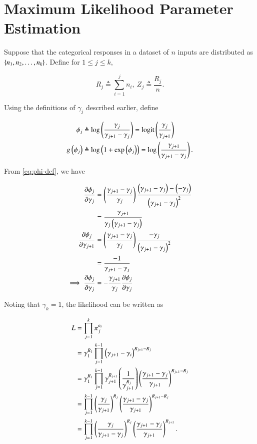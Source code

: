 \documentclass[journal,12pt,twocolumn]{IEEEtran}
\begin{document}
\section{Maximum Likelihood Parameter Estimation}

Suppose that the categorical responses in a dataset of \(n\) inputs are
distributed as \(\left\{n_1, n_2, \ldots, n_k\right\}\). Define for \(1 \le j \le k\),

\begin{equation}
     R_j \triangleq \sum_{i=1}^j n_i,\ Z_j \triangleq \frac{R_j}{n}.
     \label{eq:rz-j-def}
\end{equation}

Using the definitions of \(\gamma_j\) described earlier, define

\begin{align}
     \phi_j &\triangleq \log\brak{\frac{\gamma_j}{\gamma_{j+1}-\gamma_j}} = \mathrm{logit}\brak{\frac{\gamma_j}{\gamma_{j+1}}} \label{eq:phi-def} \\
     g\brak{\phi_j} &\triangleq \log\brak{1 + \exp\brak{\phi_j}} = \log\brak{\frac{\gamma_{j+1}}{\gamma_{j+1}-\gamma_j}}.
     \label{eq:gphi-def}
\end{align}

From \eqref{eq:phi-def}, we have

\begin{align}
     \pdiff{\gamma_j}{\phi_j} &= \brak{\frac{\gamma_{j+1}-\gamma_j}{\gamma_j}}\frac{\brak{\gamma_{j+1}-\gamma_j} - \brak{-\gamma_j}}{\brak{\gamma_{j+1}-\gamma_j}^2} \\
                              &= \frac{\gamma_{j+1}}{\gamma_j\brak{\gamma_{j+1}-\gamma_j}} \\
     \pdiff{\gamma_{j+1}}{\phi_j} &= \brak{\frac{\gamma_{j+1}-\gamma_j}{\gamma_j}}\frac{-\gamma_j}{\brak{\gamma_{j+1}-\gamma_j}^2} \\
                              &= \frac{-1}{\gamma_{j+1}-\gamma_j} \\
     \implies \pdiff{\gamma_j}{\phi_j} &= -\frac{\gamma_{j+1}}{\gamma_j}\pdiff{\gamma_j}{\phi_j}
     \label{eq:pdiff-phi-rel}
\end{align}

Noting that \(\gamma_k = 1\), the likelihood can be written as

\begin{align}
     L &= \prod_{j=1}^{k}\pi_j^{n_i} \\
       &= \gamma_1^{R_1}\prod_{j=1}^{k-1}\brak{\gamma_{j+1}-\gamma_i}^{R_{j+1}-R_j} \\
       &= \gamma_1^{R_1}\prod_{j=1}^{k-1}\gamma_{j+1}^{R_{j+1}}\brak{\frac{1}{\gamma_{j+1}^{R_j}}}\brak{\frac{\gamma_{j+1}-\gamma_j}{\gamma_{j+1}}}^{R_{j+1}-R_j} \\
       &= \prod_{j=1}^{k-1}\brak{\frac{\gamma_j}{\gamma_{j+1}}}^{R_j}\brak{\frac{\gamma_{j+1}-\gamma_j}{\gamma_{j+1}}}^{R_{j+1}-R_j} \\
       &= \prod_{j=1}^{k-1}\brak{\frac{\gamma_j}{\gamma_{j+1}-\gamma_j}}^{R_j}\brak{\frac{\gamma_{j+1}-\gamma_j}{\gamma_{j+1}}}^{R_{j+1}}.
       \label{eq:ord-reg-L}
\end{align}
\end{document}
